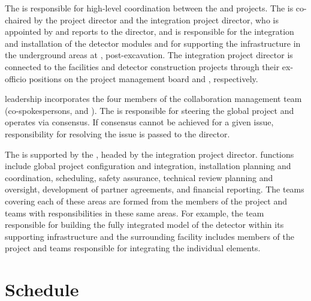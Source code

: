 The  is responsible for high-level coordination between
the  and  projects.  The  is
co-chaired by the  project director and the integration
project director, who is appointed by and reports to the 
director, and is responsible for the integration and installation of
the detector modules and for supporting the 
infrastructure in the underground areas at ,
post-excavation.  The integration project director is connected to the
facilities and detector construction projects through their ex-officio
positions on the  project management board and
 , respectively.

 leadership incorporates the four members of the
 collaboration management team (co-spokespersons,
 and ).  The  is responsible
for steering the global project and operates via consensus.  If
consensus cannot be achieved for a given issue, responsibility for
resolving the issue is passed to the  director.

The  is supported by the , headed by the
integration project director.   functions include global
project configuration and integration, installation planning and
coordination, scheduling, safety assurance, technical review planning
and oversight, development of partner agreements, and financial
reporting.  The  teams covering each of these areas are
formed from the members of the  project and 
 teams with responsibilities in these same areas.  For
example, the  team responsible for building the fully
integrated model of the detector within its supporting infrastructure
and the surrounding facility includes members of the 
project and   teams responsible for integrating
the individual elements.

\section{Schedule}
\label{sec:fdsp-coord-schedule}

